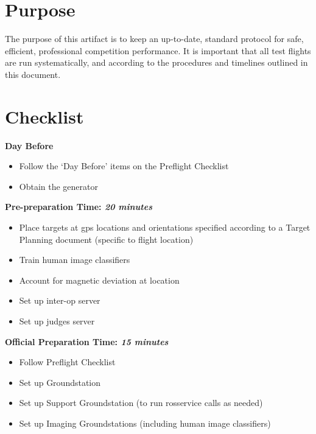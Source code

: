 \documentclass[]{auvsi_doc}
\begin{document}
\begin{AUVSITitlePage}
\begin{artifacttable}
\end{artifacttable}
\end{AUVSITitlePage}

\section{Purpose}

The purpose of this artifact is to keep an up-to-date, standard protocol for safe, efficient, professional competition performance. It is important that all test flights are run systematically, and according to the procedures and timelines outlined in this document.

\section{Checklist}

\textbf{Day Before}
\begin{itemize}
	\item Follow the `Day Before' items on the Preflight Checklist
	\item Obtain the generator
\end{itemize}

\hrulefill

\textbf{Pre-preparation Time: \textit{20 minutes}}
\begin{itemize}
	\item Place targets at gps locations and orientations specified according to a Target Planning document (specific to flight location)
	\item Train human image classifiers
	\item Account for magnetic deviation at location
	\item Set up inter-op server
	\item Set up judges server 
\end{itemize}

\hrulefill

\textbf{Official Preparation Time: \textit{15 minutes}}
\begin{itemize}
	\item Follow Preflight Checklist
	\item Set up Groundstation
	\item Set up Support Groundstation (to run rosservice calls as needed)
	\item Set up Imaging Groundstations (including human image classifiers)
\end{itemize}
\end{document}
